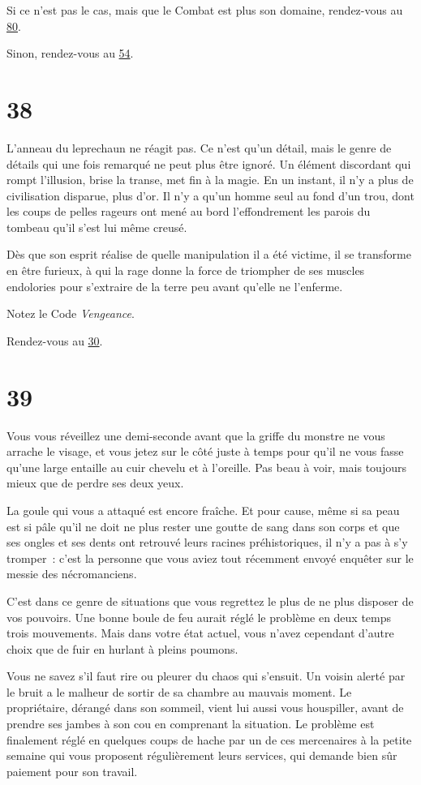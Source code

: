 \documentclass{report}
\newcommand{\gsection}[1]{
    \section{#1}
    \label{section-#1}
}
\newcommand{\glink}[1]{\hyperref[section-#1]{#1}}
\begin{document}
Si ce n'est pas le cas, mais que le Combat est plus son domaine, rendez-vous au \glink{80}.

Sinon, rendez-vous au \glink{54}.

\gsection{38}

L'anneau du leprechaun ne réagit pas. Ce n'est qu'un détail, mais le genre de détails qui une fois remarqué ne peut plus être ignoré. Un élément discordant qui rompt l'illusion, brise la transe, met fin à la magie. En un instant, il n'y a plus de civilisation disparue, plus d'or. Il n'y a qu'un homme seul au fond d'un trou, dont les coups de pelles rageurs ont mené au bord l'effondrement les parois du tombeau qu'il s'est lui même creusé.

Dès que son esprit réalise de quelle manipulation il a été victime, il se transforme en être furieux, à qui la rage donne la force de triompher de ses muscles endolories pour s'extraire de la terre peu avant qu'elle ne l'enferme.

Notez le Code \emph{Vengeance}.

Rendez-vous au \glink{30}.

\gsection{39}

Vous vous réveillez une demi-seconde avant que la griffe du monstre ne vous arrache le visage, et vous jetez sur le côté juste à temps pour qu'il ne vous fasse qu'une large entaille au cuir chevelu et à l'oreille. Pas beau à voir, mais toujours mieux que de perdre ses deux yeux.

La goule qui vous a attaqué est encore fraîche. Et pour cause, même si sa peau est si pâle qu'il ne doit ne plus rester une goutte de sang dans son corps et que ses ongles et ses dents ont retrouvé leurs racines préhistoriques, il n'y a pas à s'y tromper :  c'est la personne que vous aviez tout récemment envoyé enquêter sur le messie des nécromanciens.

C'est dans ce genre de situations que vous regrettez le plus de ne plus disposer de vos pouvoirs. Une bonne boule de feu aurait réglé le problème en deux temps trois mouvements. Mais dans votre état actuel, vous n'avez cependant d'autre choix que de fuir en hurlant à pleins poumons.

Vous ne savez s'il faut rire ou pleurer du chaos qui s'ensuit. Un voisin alerté par le bruit a le malheur de sortir de sa chambre au mauvais moment. Le propriétaire, dérangé dans son sommeil, vient lui aussi vous houspiller, avant de prendre ses jambes à son cou en comprenant la situation. Le problème est finalement réglé en quelques coups de hache par un de ces mercenaires à la petite semaine qui vous proposent régulièrement leurs services, qui demande bien sûr paiement pour son travail.
\end{document}
